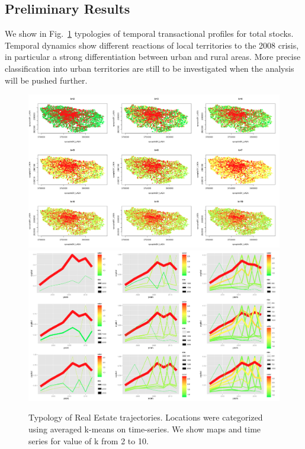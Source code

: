 \subsection{Preliminary Results}

We show in Fig.~\ref{fig:realestate} typologies of temporal transactional profiles for total stocks. Temporal dynamics show different reactions of local territories to the 2008 crisis, in particular a strong differentiation between urban and rural areas. More precise classification into urban territories are still to be investigated when the analysis will be pushed further.



\begin{figure}
\hspace{-3cm}\includegraphics[width=1.4\textwidth]{Figures/PartII/Empirical/RealEstate/normalized_k2-10}
\smallskip
\hspace{-3cm}\includegraphics[width=1.4\textwidth]{Figures/PartII/Empirical/RealEstate/trajectories_normalized_k=2-10}
\caption[Typology of Real Estate trajectories]{Typology of Real Estate trajectories. Locations were categorized using averaged k-means on time-series. We show maps and time series for value of k from 2 to 10.}
\label{fig:realestate}
\end{figure}



